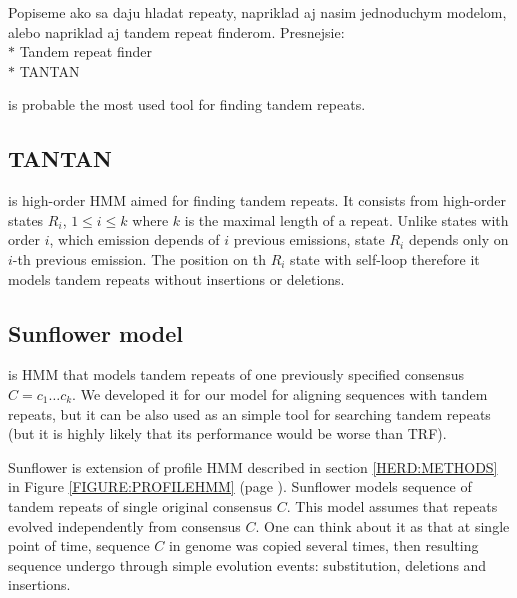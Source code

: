 \begin{reformulate*}
Popiseme ako sa daju hladat repeaty, napriklad aj nasim jednoduchym modelom,
alebo napriklad aj tandem repeat finderom.
Presnejsie:\\
$*$ Tandem repeat finder\\
$*$ TANTAN\\
\end{reformulate*}
 is probable the most used tool for
finding tandem repeats.

\subsection{TANTAN}

 is high-order HMM aimed for finding tandem repeats. It consists from
high-order states $R_i$, $1\leq i\leq k$ where $k$ is the maximal length of a
repeat. Unlike states with order $i$, which emission depends of $i$ previous
emissions, state $R_i$ depends only on $i$-th previous emission. The position
on th $R_i$ state with self-loop therefore it models tandem repeats without
insertions or deletions.


\subsection{Sunflower model}
 is HMM that models tandem repeats of one
previously specified consensus $C=c_1\dots c_k$. We developed it for our model
for aligning sequences with tandem repeats, but it can be also used as an
simple tool for searching tandem repeats (but it is highly likely that its
performance would be worse than TRF).

Sunflower is extension of profile HMM described in section \ref{HERD:METHODS}
in Figure \ref{FIGURE:PROFILEHMM} (page \pageref{FIGURE:PROFILEHMM}). Sunflower
models sequence of tandem repeats of single original consensus $C$. This model
assumes that repeats evolved independently from consensus $C$. One can think
about it as that at single point of time, sequence $C$ in genome was copied
several times, then resulting sequence undergo through simple evolution events:
substitution, deletions and insertions.

